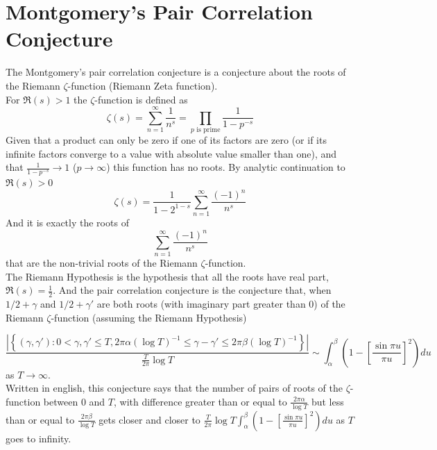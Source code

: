 \date{29/8/26}
\section{Montgomery's Pair Correlation Conjecture}
The Montgomery's pair correlation conjecture is a conjecture about the roots of the Riemann 
$\zeta$-function (Riemann Zeta function).
\\
For $\Re(s)>1$ the $\zeta$-function is defined as
\[\zeta(s)=\sum_{n=1}^\infty\frac{1}{n^s}=\prod_{p\text{ is prime}} \frac{1}{1-p^{-s}}\]
Given that a product can only be zero if one of its factors are zero (or if its infinite
factors converge to a value with absolute value smaller than one), and that 
$\frac{1}{1-p^{-s}}\rightarrow 1$ ($p\rightarrow\infty$) this function has no roots. 
By analytic continuation to $\Re(s)>0$
\[\zeta(s)=\frac{1}{1-2^{1-s}}\sum_{n=1}^\infty \frac{(-1)^n}{n^s}\]
And it is exactly the roots of 
\[\sum_{n=1}^\infty \frac{(-1)^n}{n^s}\]
that are the non-trivial roots of the Riemann $\zeta$-function. 
\\
The Riemann Hypothesis is the hypothesis that all the roots have real part, $\Re(s)=\frac{1}{2}$. 
And the pair correlation conjecture is the conjecture that, when $1/2+\gamma$ and $1/2+\gamma'$ 
are both roots (with imaginary part greater than 0) of the Riemann $\zeta$-function (assuming 
the Riemann Hypothesis)

\begin{equation}\label{first_formulation}
    \frac{\left|\left\{(\gamma, \gamma'): 0<\gamma, \gamma'\leq T, 2\pi \alpha 
    \left(\log T\right)^{-1}
    \leq \gamma-\gamma'\leq 2\pi \beta \left(\log T\right)^{-1}\right\}\right|}{\frac{T}{2\pi}
    \log T}\sim 
    \int_\alpha^\beta\left(1-\left[\frac{\sin \pi u}{\pi u}\right]^2\right)du
\end{equation}
as $T\rightarrow \infty$.
\\
Written in english, this conjecture says that the number of pairs of roots of the $\zeta$-function 
between $0$ and $T$, with difference greater than or equal to $\frac{2\pi \alpha}{\log T}$ but 
less than or equal to $\frac{2\pi \beta}{\log T}$ gets closer and closer to 
$\frac{T}{2\pi}\log T\int_\alpha^\beta \left(1-\left[\frac{\sin \pi u}{\pi u}\right]^2
\right)du$ as $T$ goes to infinity.
\\
